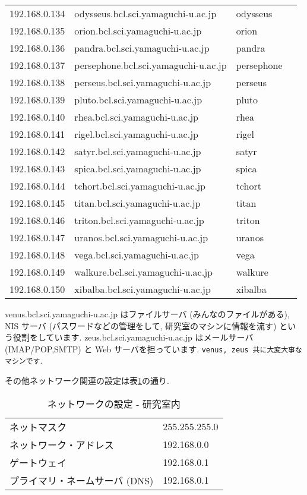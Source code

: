 \documentclass{jarticle}
\begin{document}
{\begin{table}[tbp]
\begin{tabular}[t]{llll}
192.168.0.134 &	odysseus.bcl.sci.yamaguchi-u.ac.jp &	odysseus & \\
192.168.0.135 &	orion.bcl.sci.yamaguchi-u.ac.jp &	orion & \\
192.168.0.136 &	pandra.bcl.sci.yamaguchi-u.ac.jp &	pandra & \\
192.168.0.137 &	persephone.bcl.sci.yamaguchi-u.ac.jp &	persephone & \\
192.168.0.138 &	perseus.bcl.sci.yamaguchi-u.ac.jp &	perseus & \\
192.168.0.139 &	pluto.bcl.sci.yamaguchi-u.ac.jp &	pluto & \\
192.168.0.140 &	rhea.bcl.sci.yamaguchi-u.ac.jp &	rhea & \\
192.168.0.141 &	rigel.bcl.sci.yamaguchi-u.ac.jp &	rigel & \\
192.168.0.142 &	satyr.bcl.sci.yamaguchi-u.ac.jp &	satyr & \\
192.168.0.143 &	spica.bcl.sci.yamaguchi-u.ac.jp &	spica & \\
192.168.0.144 &	tchort.bcl.sci.yamaguchi-u.ac.jp &	tchort & \\
192.168.0.145 &	titan.bcl.sci.yamaguchi-u.ac.jp &	titan & \\
192.168.0.146 &	triton.bcl.sci.yamaguchi-u.ac.jp &	triton & \\
192.168.0.147 &	uranos.bcl.sci.yamaguchi-u.ac.jp &	uranos & \\
192.168.0.148 &	vega.bcl.sci.yamaguchi-u.ac.jp &	vega & \\
192.168.0.149 &	walkure.bcl.sci.yamaguchi-u.ac.jp &	walkure & \\
192.168.0.150 &	xibalba.bcl.sci.yamaguchi-u.ac.jp &	xibalba & \\
\hline
\end{tabular}
\end{table}
}

venus.bcl.sci.yamaguchi-u.ac.jp はファイルサーバ (みんなのファイルがある),
NIS サーバ (パスワードなどの管理をして, 研究室のマシンに情報を流す)
という役割をしています.
zeus.bcl.sci.yamaguchi-u.ac.jp はメールサーバ (IMAP/POP,SMTP) と Web サーバを担っています.
\verb|venus, zeus 共に大変大事なマシンです|.

その他ネットワーク関連の設定は表\ref{tab:IPset_l}の通り.
\begin{table}[tbp]
\centering
\caption{ネットワークの設定 - 研究室内} \label{tab:IPset_l}
\begin{tabular}{ll}\hline
ネットマスク &		255.255.255.0 \\
ネットワーク・アドレス &	192.168.0.0 \\
ゲートウェイ &		192.168.0.1 \\
プライマリ・ネームサーバ (DNS) &	192.168.0.1 \\ \hline
\end{tabular}
\end{table}
\end{document}

